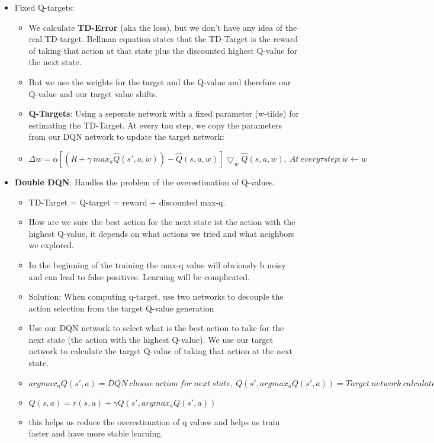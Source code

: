 \begin{itemize}[noitemsep,nolistsep]
	\item Fixed Q-targets:
	\begin{itemize}[noitemsep,nolistsep]
		\item We calculate \textbf{TD-Error} (aka the loss), but we don't have any idea of the real TD-target. Bellman equation states that the TD-Target is the reward of taking that action at that state plus the discounted highest Q-value for the next state.
		\item But we use the weights for the target and the Q-value and therefore our Q-value and our target value shifts.
		\item \textbf{Q-Targets}: Using a seperate network with a fixed parameter (w-tilde) for estimating the TD-Target. At every tau step, we copy the parameters from our DQN network to update the target network:
		\item $\Delta w = \alpha [(R + \gamma\ max_a \hat{Q}(s',a,\tilde{w})) - \hat{Q}(s,a,w)]\bigtriangledown_w \hat{Q}(s,a,w),\ At\ every \tau step: \tilde{w} \leftarrow w$
	\end{itemize} 
	\item \textbf{Double DQN}: Handles the problem of the overestimation of Q-values.
	\begin{itemize}[noitemsep,nolistsep]
		\item TD-Target = Q-target = reward + discounted max-q.
		\item How are we sure the best action for the next state ist the action with the highest Q-value, it depends on what actions we tried and what neighbors we explored.
		\item In the beginning of the training the max-q value will obviously b noisy and can lead to false positives. Learning will be complicated.
		\item Solution: When computing q-target, use two networks to decouple the action selection from the target Q-value generation
		\item Use our DQN network to select what is the best action to take for the next state (the action with the highest Q-value). We use our target network to calculate the target Q-value of taking that action at the next state.
		\item $argmax_a Q(s',a) = DQN\ choose\ action\ for\ next\ state,\ Q(s',argmax_a Q(s',a)) = Target\ network\ calculates\ the\ qvalue.$
		\item $Q(s,a) = r(s,a) + \gamma Q(s',argmax_a Q(s',a))$
		\item this helps us reduce the overestimation of q values and helps us train faster and have more stable learning.

\end{itemize}
\end{itemize}
